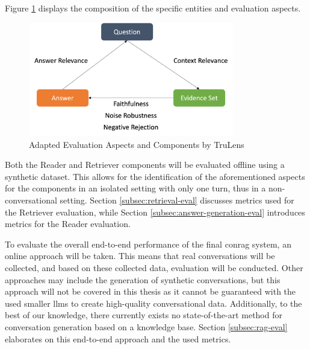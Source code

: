 Figure \ref{fig:evaluation-dimensions} displays the composition of the specific entities and evaluation aspects.

\begin{figure}[H]
    \centering
    \includegraphics[width=0.8\textwidth]{Grafiken/Evaluation_Dimensions_RAGAS_Turelens.png}
    \caption{Adapted Evaluation Aspects and Components by TruLens \cite{noauthor_truelens}}
    \label{fig:evaluation-dimensions}
\end{figure}

Both the Reader and Retriever components will be evaluated offline using a synthetic dataset. This allows for the identification of the aforementioned aspects for the components in an isolated setting with only one turn, thus in a non-conversational setting. Section \ref{subsec:retrieval-eval} discusses metrics used for the Retriever evaluation, while Section \ref{subsec:answer-generation-eval} introduces metrics for the Reader evaluation.

To evaluate the overall end-to-end performance of the final \gls{conrag} system, an online approach will be taken. This means that real conversations will be collected, and based on these collected data, evaluation will be conducted. Other approaches may include the generation of synthetic conversations, but this approach will not be covered in this thesis as it cannot be guaranteed with the used smaller \gls{llm}s to create high-quality conversational data. Additionally, to the best of our knowledge, there currently exists no state-of-the-art method for conversation generation based on a knowledge base. Section \ref{subsec:rag-eval} elaborates on this end-to-end approach and the used metrics.



